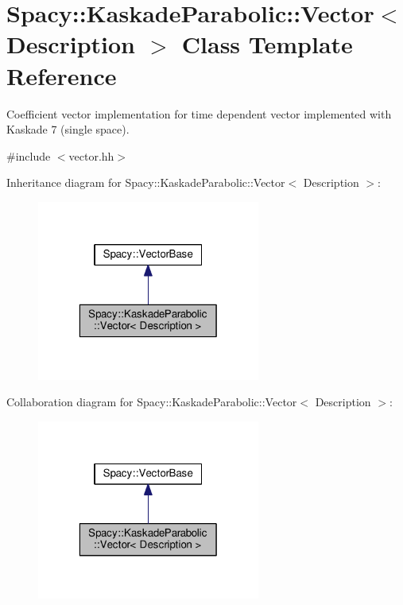 \hypertarget{classSpacy_1_1KaskadeParabolic_1_1Vector}{\section{Spacy\-:\-:Kaskade\-Parabolic\-:\-:Vector$<$ Description $>$ Class Template Reference}
\label{classSpacy_1_1KaskadeParabolic_1_1Vector}
}


Coefficient vector implementation for time dependent vector implemented with Kaskade 7 (single space).  




{\ttfamily \#include $<$vector.\-hh$>$}



Inheritance diagram for Spacy\-:\-:Kaskade\-Parabolic\-:\-:Vector$<$ Description $>$\-:
\nopagebreak
\begin{figure}[H]
\begin{center}
\leavevmode
\includegraphics[width=208pt]{classSpacy_1_1KaskadeParabolic_1_1Vector__inherit__graph}
\end{center}
\end{figure}


Collaboration diagram for Spacy\-:\-:Kaskade\-Parabolic\-:\-:Vector$<$ Description $>$\-:
\nopagebreak
\begin{figure}[H]
\begin{center}
\leavevmode
\includegraphics[width=208pt]{classSpacy_1_1KaskadeParabolic_1_1Vector__coll__graph}
\end{center}
\end{figure}
